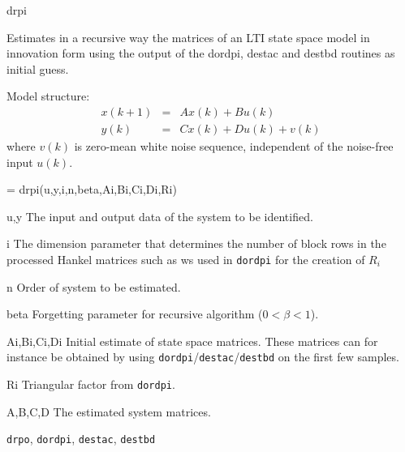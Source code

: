\documentclass{book}
\newcommand{\destbd}{\texttt{destbd}}
\newcommand{\dordpi}{\texttt{dordpi}}
\newcommand{\destac}{\texttt{destac}}
\newcommand{\drpo}{\texttt{drpo}}
\begin{document}
\begin{command}{drpi}
\begin{purpose}
  Estimates in a recursive way the matrices of an LTI state space
  model in innovation form using the output of the dordpi, destac
  and destbd routines as initial guess.

  Model structure:
  \begin{eqnarray*}
    x(k+1) & = &  A x(k) + B u(k)\\
    y(k) & = & C x(k) + D u(k) + v(k)
  \end{eqnarray*}
  where $v(k)$ is zero-mean white noise sequence, independent of the
  noise-free input $u(k)$.
\end{purpose}

\begin{syntax}
[A,B,C,D]= drpi(u,y,i,n,beta,Ai,Bi,Ci,Di,Ri)
\end{syntax}

\begin{inputs}
\item[u,y] The input and output data of the system to be identified.
  \item[i] The dimension parameter that determines the number of block
    rows in the processed Hankel matrices such as ws used in {\dordpi}
    for the creation of $R_i$
  \item[n] Order of system to be estimated.
  \item[beta] Forgetting parameter for recursive algorithm ($0 < \beta < 1$).
  \item[Ai,Bi,Ci,Di] Initial estimate of state space matrices.  These
    matrices can for instance be obtained by using
    {\dordpi}/{\destac}/{\destbd} on the first few samples.
  \item[Ri] Triangular factor from {\dordpi}.
 \end{inputs}

\begin{outputs}
\item[A,B,C,D] The estimated system matrices.
\end{outputs}
          
\begin{seealso}
{\drpo}, {\dordpi}, {\destac}, {\destbd}
\end{seealso}
\end{command}%
\end{document}
